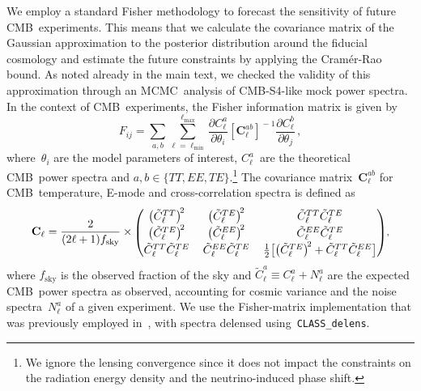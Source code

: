 \documentclass[11pt]{article}
\numberwithin{equation}{section}
\begin{document}
We employ a standard Fisher methodology to forecast the sensitivity of future CMB~experiments. This means that we calculate the covariance matrix of the Gaussian approximation to the posterior distribution around the fiducial cosmology and estimate the future constraints by applying the Cramér-Rao bound. As noted already in the main text, we checked the validity of this approximation through an MCMC~analysis of \mbox{CMB-S4}-like mock power spectra. In the context of CMB~experiments, the Fisher information matrix is given by
\begin{equation}
	F_{ij} = \sum_{a,b}\sum^{\ell_\mathrm{max}}_{\ell=\ell_\mathrm{min}}\frac{\partial C^a_\ell}{\partial \theta_i} \left[\mathbf{C}^{a b}_\ell\right]^{\!-1} \frac{\partial C^b_\ell}{\partial \theta_j}\, ,	\label{eq:Fisher}
\end{equation}
where~$\theta_i$ are the model parameters of interest, $C_\ell^a$~are the theoretical CMB~power spectra and $a, b \in \{TT, EE, TE\}$.\footnote{We ignore the lensing convergence since it does not impact the constraints on the radiation energy density and the neutrino-induced phase shift.}
The covariance matrix~$\mathbf{C}^{ab}_\ell$ for CMB~temperature, E-mode and cross-correlation spectra is defined as
\begin{equation}
	\mathbf{C}_{\ell} = \frac{2}{(2 \ell+1) f_\mathrm{sky}} \times \,
	\begingroup
	\scriptstyle \renewcommand*{\arraystretch}{1.2} \setlength{\arraycolsep}{6pt}
	\begin{pmatrix}
		\bigl(\tilde{C}_\ell^{TT}\bigr)^{\!2}	& \bigl(\tilde{C}_\ell^{TE}\bigr)^{\!2}		& \tilde{C}_\ell^{TT} \tilde{C}_\ell^{TE}																	\\
		\bigl(\tilde{C}_\ell^{TE}\bigr)^{\!2}	& \bigl(\tilde{C}_\ell^{EE}\bigr)^{\!2}		& \tilde{C}_\ell^{EE} \tilde{C}_\ell^{TE}																	\\
		\tilde{C}_\ell^{TT} \tilde{C}_\ell^{TE}	& \tilde{C}_\ell^{EE} \tilde{C}_\ell^{TE}	& \frac{1}{2} \bigl[\bigl(\tilde{C}_\ell^{TE}\bigr)^{\!2} + \tilde{C}_\ell^{TT} \tilde{C}_\ell^{EE}\bigr]
	\end{pmatrix}
	\endgroup ,
	\label{eq:Fisher_covariance}
\end{equation}
where $f_\mathrm{sky}$ is the observed fraction of the sky and $\tilde{C}_\ell^a \equiv C_{\ell}^a + N_\ell^a$ are the expected CMB~power spectra as observed, accounting for cosmic variance and the noise spectra~$N_\ell^a$ of a given experiment. We use the Fisher-matrix implementation that was previously employed in~\cite{Baumann:2017gkg, Beutler:2019ojk}, with spectra delensed using~\texttt{CLASS\_delens}.\medskip
\end{document}

